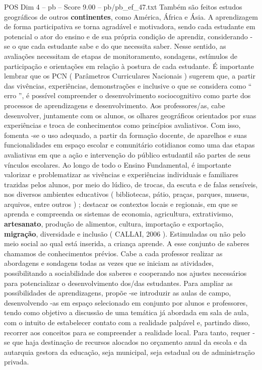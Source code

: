 \begin{textsample}{POS Dim 4 – pb – Score 9.00 – pb/pb\_ef\_47.txt}
Também são feitos estudos geográficos de outros \textbf{continentes}, como América, África e Ásia.
A aprendizagem de forma participativa se torna agradável e motivadora, sendo cada estudante em potencial o ator do ensino e de sua própria condição de aprendiz, considerando -se o que cada estudante sabe e do que necessita saber.
Nesse sentido, as avaliações necessitam de etapas de monitoramento, sondagens, estímulos de participação e orientações em relação à postura de cada estudante.
É importante lembrar que os PCN ( Parâmetros Curriculares Nacionais ) sugerem que, a partir das vivências, experiências, demonstrações e inclusive o que se considera como “ erro ”, é possível compreender o desenvolvimento sociocognitivo como parte dos processos de aprendizagens e desenvolvimento.
Aos professores/as, cabe desenvolver, juntamente com os alunos, os olhares geográficos orientados por suas experiências e troca de conhecimentos como princípios avaliativos.
Com isso, fomenta -se o uso adequado, a partir da formação docente, de aparelhos e suas funcionalidades em espaço escolar e comunitário cotidianos como uma das etapas avaliativas em que a ação e intervenção do público estudantil são partes de seus vínculos escolares.
Ao longo de todo o Ensino Fundamental, é importante valorizar e problematizar as vivências e experiências individuais e familiares trazidas pelos alunos, por meio do lúdico, de trocas, da escuta e de falas sensíveis, nos diversos ambientes educativos ( bibliotecas, pátio, praças, parques, museus, arquivos, entre outros ) ; destacar os contextos locais e regionais, em que se aprenda e compreenda os sistemas de economia, agricultura, extrativismo, \textbf{artesanato}, produção de alimentos, cultura, importação e exportação, \textbf{migração}, diversidade e inclusão ( CALLAI, 2006 ).
Estimuladas ou não pelo meio social ao qual está inserida, a criança aprende.
A esse conjunto de saberes chamamos de conhecimentos prévios.
Cabe a cada professor realizar as abordagens e sondagens todas as vezes que se iniciam as atividades, possibilitando a sociabilidade dos saberes e cooperando nos ajustes necessários para potencializar o desenvolvimento dos/das estudantes.
Para ampliar as possibilidades de aprendizagens, propõe -se introduzir as aulas de campo, desenvolvendo -as em espaço selecionado em conjunto por alunos e professores, tendo como objetivo a discussão de uma temática já abordada em sala de aula, com o intuito de estabelecer contato com a realidade palpável e, partindo disso, recorrer aos conceitos para se compreender a realidade local.
Para tanto, requer -se que haja destinação de recursos alocados no orçamento anual da escola e da autarquia gestora da educação, seja municipal, seja estadual ou de administração privada.

\end{textsample}
